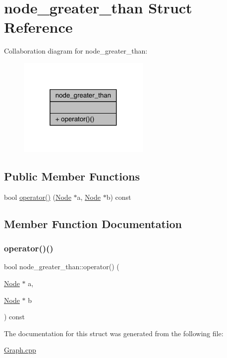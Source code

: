 \hypertarget{structnode__greater__than}{}\section{node\+\_\+greater\+\_\+than Struct Reference}
\label{structnode__greater__than}


Collaboration diagram for node\+\_\+greater\+\_\+than\+:\nopagebreak
\begin{figure}[H]
\begin{center}
\leavevmode
\includegraphics[width=181pt]{structnode__greater__than__coll__graph}
\end{center}
\end{figure}
\subsection*{Public Member Functions}
\begin{DoxyCompactItemize}
\item 
bool \hyperlink{structnode__greater__than_ac91d8c047b4c548f2c1ddf95af5a8f6d}{operator()} (\hyperlink{class_node}{Node} $\ast$a, \hyperlink{class_node}{Node} $\ast$b) const
\end{DoxyCompactItemize}


\subsection{Member Function Documentation}
\hypertarget{structnode__greater__than_ac91d8c047b4c548f2c1ddf95af5a8f6d}{}\label{structnode__greater__than_ac91d8c047b4c548f2c1ddf95af5a8f6d} 
\subsubsection{\texorpdfstring{operator()()}{operator()()}}
{\footnotesize\ttfamily bool node\+\_\+greater\+\_\+than\+::operator() (\begin{DoxyParamCaption}\item[{\hyperlink{class_node}{Node} $\ast$}]{a,  }\item[{\hyperlink{class_node}{Node} $\ast$}]{b }\end{DoxyParamCaption}) const\hspace{0.3cm}{\ttfamily [inline]}}



The documentation for this struct was generated from the following file\+:\begin{DoxyCompactItemize}
\item 
\hyperlink{_graph_8cpp}{Graph.\+cpp}\end{DoxyCompactItemize}
